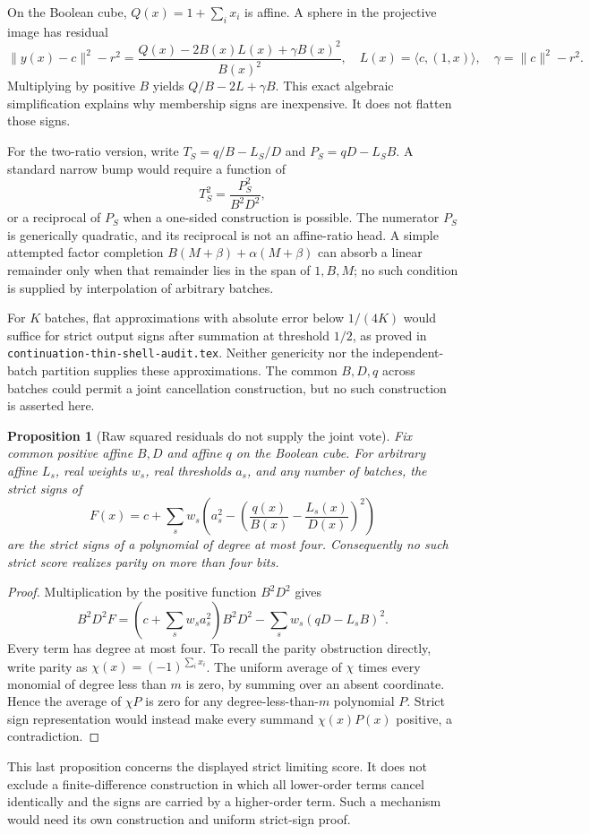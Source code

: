 \documentclass[11pt]{article}
\newtheorem{proposition}{Proposition}
\begin{document}
On the Boolean cube, $Q(x)=1+\sum_i x_i$ is affine. A sphere in the
projective image has residual
\[
 \|y(x)-c\|^2-r^2
 =\frac{Q(x)-2B(x)L(x)+\gamma B(x)^2}{B(x)^2},
 \quad L(x)=\langle c,(1,x)\rangle,\quad
 \gamma=\|c\|^2-r^2.
\]
Multiplying by positive $B$ yields
$Q/B-2L+\gamma B$. This exact algebraic simplification explains why
membership signs are inexpensive. It does not flatten those signs.

For the two-ratio version, write
$T_S=q/B-L_S/D$ and
$P_S=qD-L_SB$. A standard narrow bump would require a function of
\[
 T_S^2=\frac{P_S^2}{B^2D^2},
\]
or a reciprocal of $P_S$ when a one-sided construction is possible.
The numerator $P_S$ is generically quadratic, and its reciprocal is
not an affine-ratio head. A simple attempted factor completion
$B(M+\beta)+\alpha(M+\beta)$ can absorb a linear remainder only when
that remainder lies in the span of $1,B,M$; no such condition is
supplied by interpolation of arbitrary batches.

For $K$ batches, flat approximations with absolute error below
$1/(4K)$ would suffice for strict output signs after summation at
threshold $1/2$, as proved in
\texttt{continuation-thin-shell-audit.tex}. Neither genericity nor
the independent-batch partition supplies these approximations.
The common $B,D,q$ across batches could permit a joint cancellation
construction, but no such construction is asserted here.

\begin{proposition}[Raw squared residuals do not supply the joint vote]
Fix common positive affine $B,D$ and affine $q$ on the Boolean
cube. For arbitrary affine $L_s$, real weights $w_s$, real
thresholds $a_s$, and any number of batches, the strict signs of
\[
 F(x)=c+\sum_s w_s\left(a_s^2-
          \left(\frac{q(x)}{B(x)}-\frac{L_s(x)}{D(x)}\right)^2\right)
\]
are the strict signs of a polynomial of degree at most four.
Consequently no such strict score realizes parity on more than
four bits.
\end{proposition}
\begin{proof}
Multiplication by the positive function $B^2D^2$ gives
\[
 B^2D^2F=
 \left(c+\sum_s w_sa_s^2\right)B^2D^2
 -\sum_s w_s(qD-L_sB)^2.
\]
Every term has degree at most four. To recall the parity obstruction
directly, write parity as $\chi(x)=(-1)^{\sum_i x_i}$. The uniform
average of $\chi$ times every monomial of degree less than $m$ is
zero, by summing over an absent coordinate. Hence the average of
$\chi P$ is zero for any degree-less-than-$m$ polynomial $P$.
Strict sign representation would instead make every summand
$\chi(x)P(x)$ positive, a contradiction.
\end{proof}

This last proposition concerns the displayed strict limiting score.
It does not exclude a finite-difference construction in which all
lower-order terms cancel identically and the signs are carried by a
higher-order term. Such a mechanism would need its own construction
and uniform strict-sign proof.
\end{document}
